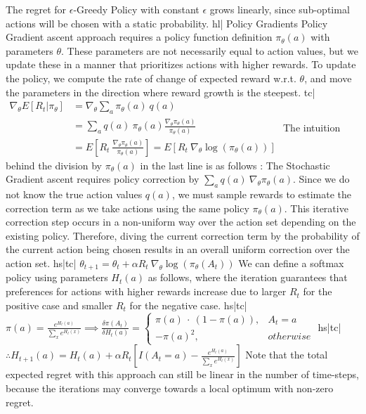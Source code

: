 The regret for \(\epsilon\)-Greedy Policy with constant \(\epsilon\) grows linearly, since sub-optimal actions will be chosen with a static probability.
hl| Policy Gradients
Policy Gradient ascent approach requires a policy function definition \(\pi_\theta(a)\) with parameters \(\theta\). These parameters are not necessarily equal to action values, but we update these in a manner that prioritizes actions with higher rewards. To update the policy, we compute the rate of change of expected reward w.r.t. \(\theta\), and move the parameters in the direction where reward growth is the steepest.
tc| \( \begin{aligned} \nabla_\theta E[R_t | \pi_\theta] &= \nabla_\theta \sum_a \pi_\theta(a) \ q(a) \\ &= \sum_a q(a) \ \pi_\theta(a) \frac{\nabla_\theta \pi_\theta(a)}{\pi_\theta(a)} \\ &= E\left[R_t \ \frac{\nabla_\theta \pi_\theta(a)}{\pi_\theta(a)} \right] = E\left[ R_t \ \nabla_\theta \log(\pi_\theta(a)) \right] \end{aligned} \)
The intuition behind the division by \(\pi_\theta(a)\) in the last line is as follows : The Stochastic Gradient ascent requires policy correction by \(\sum_a q(a) \ \nabla_\theta \pi_\theta(a) \). Since we do not know the true action values \(q(a)\), we must sample rewards to estimate the correction term as we take actions using the same policy \(\pi_\theta(a)\). This iterative correction step occurs in a non-uniform way over the action set depending on the existing policy. Therefore, diving the current correction term by the probability of the current action being chosen results in an overall uniform correction over the action set.
hs|tc| \( \theta_{t+1} = \theta_t + \alpha R_t \ \nabla_\theta \log(\pi_\theta(A_t)) \)
We can define a softmax policy using parameters \(H_t(a)\) as follows, where the iteration guarantees that preferences for actions with higher rewards increase due to larger \(R_t\) for the positive case and smaller \(R_t\) for the negative case.
hs|tc| \( \pi(a) = \frac{e^{H_t(a)}}{\sum_x e^{H_t(x)}} \implies \frac{\delta \pi(A_t)}{\delta H_t(a)} = \begin{cases} \pi(a) \ \cdot \ (1 - \pi(a)), & A_t=a \\ - \pi(a)^2, & otherwise \end{cases} \)
hs|tc| \( \therefore H_{t+1}(a) = H_t(a) + \alpha R_t \left[I(A_t=a) - \frac{e^{H_t(a)}}{\sum_x e^{H_t(x)}}\right] \)
Note that the total expected regret with this approach can still be linear in the number of time-steps, because the iterations may converge towards a local optimum with non-zero regret.

